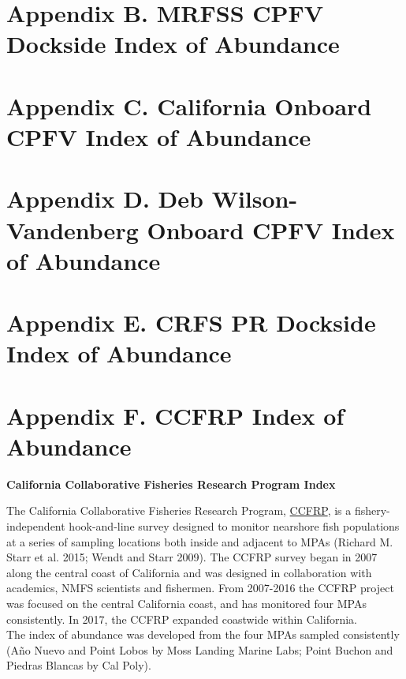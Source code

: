 \documentclass[11pt,
  english,
  letterpaper,
]{article}
\begin{document}
\newpage

\hypertarget{mrfss-cpfv-index}{%
\section{Appendix B. MRFSS CPFV Dockside Index of Abundance}\label{mrfss-cpfv-index}}

\hypertarget{onboard-cpfv-index}{%
\section{Appendix C. California Onboard CPFV Index of Abundance}\label{onboard-cpfv-index}}

\hypertarget{dwv-cpfv-index}{%
\section{Appendix D. Deb Wilson-Vandenberg Onboard CPFV Index of Abundance}\label{dwv-cpfv-index}}

\hypertarget{crfs-pr-index}{%
\section{Appendix E. CRFS PR Dockside Index of Abundance}\label{crfs-pr-index}}

\hypertarget{ccfrp-index}{%
\section{Appendix F. CCFRP Index of Abundance}\label{ccfrp-index}}

\textbf{California Collaborative Fisheries Research Program Index}

The California Collaborative Fisheries Research Program, \href{https://www.mlml.calstate.edu/ccfrp/}{CCFRP}, is a fishery-independent hook-and-line survey designed to monitor nearshore fish populations at a series of sampling locations both inside and adjacent to MPAs (Richard M. Starr et al. 2015; Wendt and Starr 2009). The CCFRP survey began in 2007 along the central coast of California and was designed in collaboration with academics, NMFS scientists and fishermen. From 2007-2016 the CCFRP project was focused on the central California coast, and has monitored four MPAs consistently. In 2017, the CCFRP expanded coastwide within California.\\
The index of abundance was developed from the four MPAs sampled consistently (Año Nuevo and Point Lobos by Moss Landing Marine Labs; Point Buchon and Piedras Blancas by Cal Poly).
\end{document}
